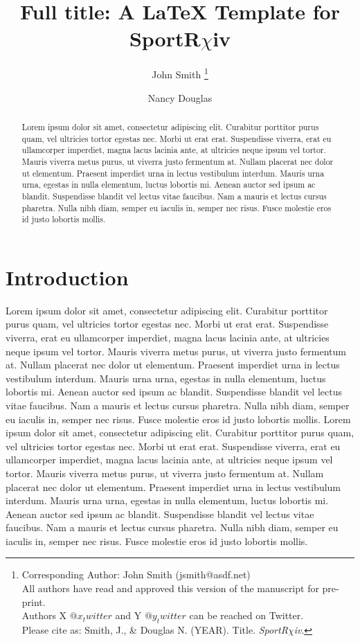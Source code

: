 \documentclass[12pt, firstpage]{article}
\title{Full title: A LaTeX Template for SportR$\chi$iv}
\author[1,2]{John Smith
\thanks{Corresponding Author:  John Smith (jsmith@asdf.net)\\
All authors have read and approved this version of the manuscript for pre-print.\\
Authors X \(@x_twitter\) and Y \(@y_twitter\) can be reached on Twitter.\\
Please cite as: Smith, J., & Douglas N. (YEAR). Title. \textit{SportR$\chi$iv}. }
}
\author[3]{Nancy Douglas}
\affil[1]{Affiliation 1}
\affil[2]{Affiliation 2}
\affil[3]{Affiliation 3}
\begin{document}
\maketitle
    \thispagestyle{firstpage}
    \begin{abstract}
Lorem ipsum dolor sit amet, consectetur adipiscing elit. Curabitur porttitor purus quam, vel ultricies tortor egestas nec. Morbi ut erat erat. Suspendisse viverra, erat eu ullamcorper imperdiet, magna lacus lacinia ante, at ultricies neque ipsum vel tortor. Mauris viverra metus purus, ut viverra justo fermentum at. Nullam placerat nec dolor ut elementum. Praesent imperdiet urna in lectus vestibulum interdum. Mauris urna urna, egestas in nulla elementum, luctus lobortis mi. Aenean auctor sed ipsum ac blandit. Suspendisse blandit vel lectus vitae faucibus. Nam a mauris et lectus cursus pharetra. Nulla nibh diam, semper eu iaculis in, semper nec risus. Fusce molestie eros id justo lobortis mollis.
    \end{abstract}
\newpage


\section{Introduction}
Lorem ipsum dolor sit amet, consectetur adipiscing elit. Curabitur porttitor purus quam, vel ultricies tortor egestas nec. Morbi ut erat erat. Suspendisse viverra, erat eu ullamcorper imperdiet, magna lacus lacinia ante, at ultricies neque ipsum vel tortor. Mauris viverra metus purus, ut viverra justo fermentum at. Nullam placerat nec dolor ut elementum. Praesent imperdiet urna in lectus vestibulum interdum. Mauris urna urna, egestas in nulla elementum, luctus lobortis mi. Aenean auctor sed ipsum ac blandit. Suspendisse blandit vel lectus vitae faucibus. Nam a mauris et lectus cursus pharetra. Nulla nibh diam, semper eu iaculis in, semper nec risus. Fusce molestie eros id justo lobortis mollis.
Lorem ipsum dolor sit amet, consectetur adipiscing elit. Curabitur porttitor purus quam, vel ultricies tortor egestas nec. Morbi ut erat erat. Suspendisse viverra, erat eu ullamcorper imperdiet, magna lacus lacinia ante, at ultricies neque ipsum vel tortor. Mauris viverra metus purus, ut viverra justo fermentum at. Nullam placerat nec dolor ut elementum. Praesent imperdiet urna in lectus vestibulum interdum. Mauris urna urna, egestas in nulla elementum, luctus lobortis mi. Aenean auctor sed ipsum ac blandit. Suspendisse blandit vel lectus vitae faucibus. Nam a mauris et lectus cursus pharetra. Nulla nibh diam, semper eu iaculis in, semper nec risus. Fusce molestie eros id justo lobortis mollis.
\end{document}
